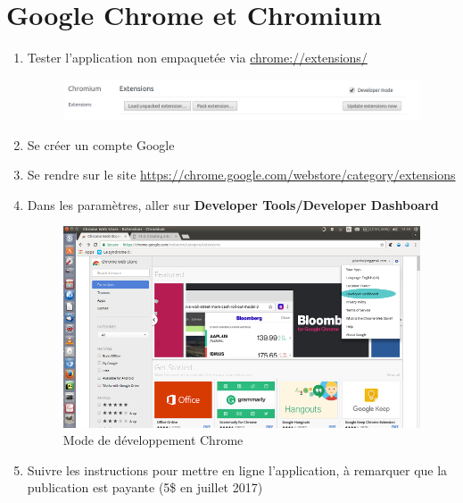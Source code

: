 \documentclass[a4paper,10pt]{report}
\begin{document}
\section{Google Chrome et Chromium}
\begin{enumerate}
 \item Tester l'application non empaquetée via \url{chrome://extensions/}
 \begin{figure}[h]
  \includegraphics[scale=0.5]{test_chrome.png}
 \end{figure}
  \item Se créer un compte Google
 \item Se rendre sur le site \url{https://chrome.google.com/webstore/category/extensions}
 \item Dans les paramètres, aller sur \textbf{Developer Tools/Developer Dashboard}
 \begin{figure}[h]
 \includegraphics[scale=0.5]{chrome.png}
 \caption{Mode de développement Chrome}
\end{figure}
 \item Suivre les instructions pour mettre en ligne l'application, à remarquer que la publication est payante (5\$ en juillet 2017)
\end{enumerate}
\end{document}
